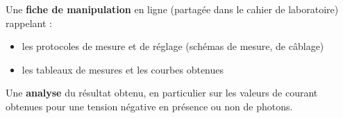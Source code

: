 Une \textbf{fiche de manipulation} en ligne (partagée dans le cahier de laboratoire) rappelant :

\begin{itemize}
	\item les protocoles de mesure et de réglage (schémas de mesure, de câblage)
	\item les tableaux de mesures et les courbes obtenues
\end{itemize}

Une \textbf{analyse} du résultat obtenu, en particulier sur les valeurs de courant obtenues pour une tension négative en présence ou non de photons.

